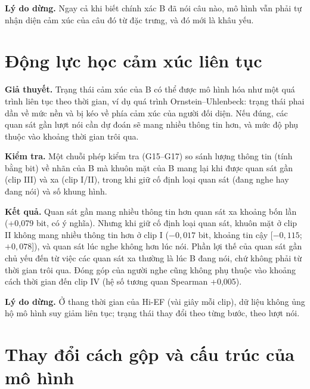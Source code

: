 \textbf{Lý do dừng.} Ngay cả khi biết chính xác B đã nói câu nào, mô hình vẫn phải tự nhận diện cảm xúc của câu đó từ đặc trưng, và đó mới là khâu yếu.

\section{Động lực học cảm xúc liên tục}

\textbf{Giả thuyết.} Trạng thái cảm xúc của B có thể được mô hình hóa như một quá trình liên tục theo thời gian, ví dụ quá trình Ornstein--Uhlenbeck: trạng thái phai dần về mức nền và bị kéo về phía cảm xúc của người đối diện. Nếu đúng, các quan sát gần lượt nói cần dự đoán sẽ mang nhiều thông tin hơn, và mức độ phụ thuộc vào khoảng thời gian trôi qua.

\textbf{Kiểm tra.} Một chuỗi phép kiểm tra (G15--G17) so sánh lượng thông tin (tính bằng bit) về nhãn của B mà khuôn mặt của B mang lại khi được quan sát gần (clip III) và xa (clip I/II), trong khi giữ cố định loại quan sát (đang nghe hay đang nói) và số khung hình.

\textbf{Kết quả.} Quan sát gần mang nhiều thông tin hơn quan sát xa khoảng bốn lần (+0,079 bit, có ý nghĩa). Nhưng khi giữ cố định loại quan sát, khuôn mặt ở clip II không mang nhiều thông tin hơn ở clip I ($-0{,}017$ bit, khoảng tin cậy [$-0{,}115$; $+0{,}078$]), và quan sát lúc nghe không hơn lúc nói. Phần lợi thế của quan sát gần chủ yếu đến từ việc các quan sát xa thường là lúc B đang nói, chứ không phải từ thời gian trôi qua. Đóng góp của người nghe cũng không phụ thuộc vào khoảng cách thời gian đến clip IV (hệ số tương quan Spearman +0,005).

\textbf{Lý do dừng.} Ở thang thời gian của Hi-EF (vài giây mỗi clip), dữ liệu không ủng hộ mô hình suy giảm liên tục; trạng thái thay đổi theo từng bước, theo lượt nói.

\section{Thay đổi cách gộp và cấu trúc của mô hình}

